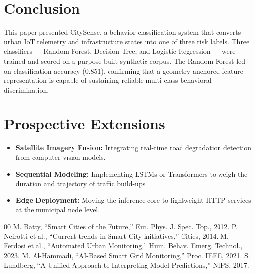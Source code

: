 \documentclass[conference]{IEEEtran}
\begin{document}
\section{Conclusion}
This paper presented CitySense, a behavior-classification system that converts urban IoT telemetry and infrastructure states into one of three risk labels. Three classifiers --- Random Forest, Decision Tree, and Logistic Regression --- were trained and scored on a purpose-built synthetic corpus. The Random Forest led on classification accuracy (0.851), confirming that a geometry-anchored feature representation is capable of sustaining reliable multi-class behavioral discrimination.

\section{Prospective Extensions}
\begin{itemize}
    \item \textbf{Satellite Imagery Fusion:} Integrating real-time road degradation detection from computer vision models.
    \item \textbf{Sequential Modeling:} Implementing LSTMs or Transformers to weigh the duration and trajectory of traffic build-ups.
    \item \textbf{Edge Deployment:} Moving the inference core to lightweight HTTP services at the municipal node level.
\end{itemize}

\begin{thebibliography}{00}
 M. Batty, ``Smart Cities of the Future,'' Eur. Phys. J. Spec. Top., 2012.
 P. Neirotti et al., ``Current trends in Smart City initiatives,'' Cities, 2014.
 M. Ferdosi et al., ``Automated Urban Monitoring,'' Hum. Behav. Emerg. Technol., 2023.
 M. Al-Hammadi, ``AI-Based Smart Grid Monitoring,'' Proc. IEEE, 2021.
 S. Lundberg, ``A Unified Approach to Interpreting Model Predictions,'' NIPS, 2017.
\end{thebibliography}
\end{document}
